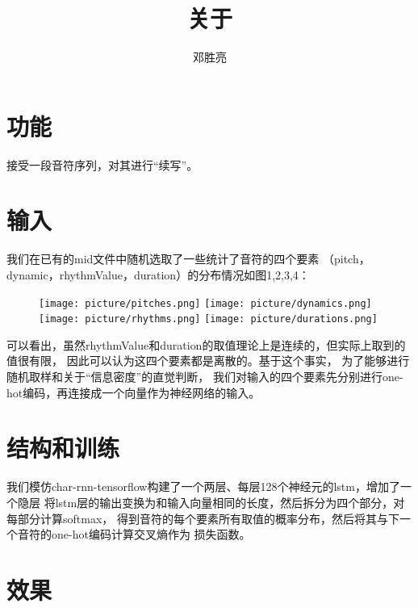 \documentclass{article}
\title{关于}
\author{邓胜亮}
\begin{document}
  \section{功能}
    接受一段音符序列，对其进行“续写”。
  \section{输入}
    我们在已有的mid文件中随机选取了一些统计了音符的四个要素
    （pitch，dynamic，rhythmValue，duration）的分布情况如图1,2,3,4：
    \begin{figure}[H]
      \texttt{[image: picture/pitches.png]}
      \texttt{[image: picture/dynamics.png]}
      \texttt{[image: picture/rhythms.png]}
      \texttt{[image: picture/durations.png]}
    \end{figure}
    可以看出，虽然rhythmValue和duration的取值理论上是连续的，但实际上取到的值很有限，
    因此可以认为这四个要素都是离散的。基于这个事实，
    为了能够进行随机取样和关于“信息密度”的直觉判断，
    我们对输入的四个要素先分别进行one-hot编码，再连接成一个向量作为神经网络的输入。

  \section{结构和训练}
    我们模仿char-rnn-tensorflow构建了一个两层、每层128个神经元的lstm，增加了一个隐层
    将lstm层的输出变换为和输入向量相同的长度，然后拆分为四个部分，对每部分计算softmax，
    得到音符的每个要素所有取值的概率分布，然后将其与下一个音符的one-hot编码计算交叉熵作为
    损失函数。
  \section{效果}
\end{document}
